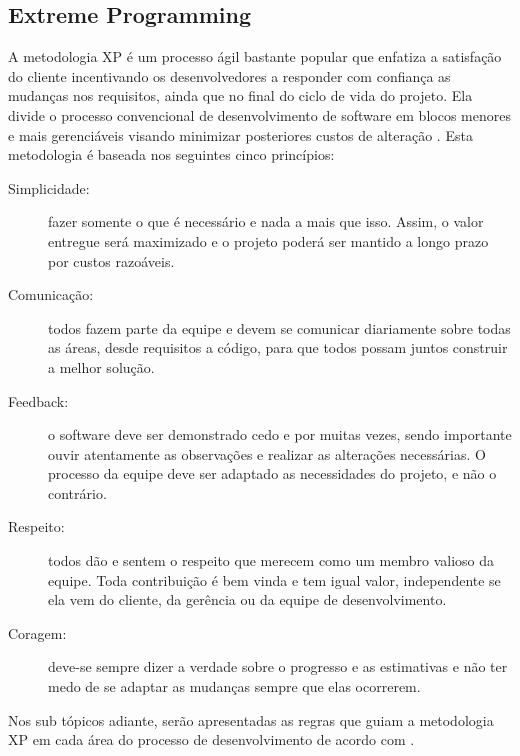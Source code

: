 \subsection{Extreme Programming}

A metodologia \gls{XP} é um processo ágil bastante popular que enfatiza a satisfação
do cliente incentivando os desenvolvedores a responder com confiança as mudanças
nos requisitos, ainda que no final do ciclo de vida do projeto. Ela divide o processo
convencional de desenvolvimento de software em blocos menores e mais gerenciáveis visando
minimizar posteriores custos de alteração \cite{Wells2000,Despa2014}. Esta metodologia é
baseada nos seguintes cinco princípios:

\begin{description}
    \item[Simplicidade:] fazer somente o que é necessário e nada a mais que isso. Assim,
    o valor entregue será maximizado e o projeto poderá ser mantido a longo prazo por
    custos razoáveis.
    \item[Comunicação:] todos fazem parte da equipe e devem se comunicar diariamente
    sobre todas as áreas, desde requisitos a código, para que todos possam juntos
    construir a melhor solução.
    \item[Feedback:] o software deve ser demonstrado cedo e por muitas vezes, sendo
    importante ouvir atentamente as observações e realizar as alterações necessárias.
    O processo da equipe deve ser adaptado as necessidades do projeto, e não o contrário.
    \item[Respeito:] todos dão e sentem o respeito que merecem como um membro valioso
    da equipe. Toda contribuição é bem vinda e tem igual valor, independente se ela vem
    do cliente, da gerência ou da equipe de desenvolvimento.
    \item[Coragem:] deve-se sempre dizer a verdade sobre o progresso e as estimativas e
    não ter medo de se adaptar as mudanças sempre que elas ocorrerem.
\end{description}

Nos sub tópicos adiante, serão apresentadas as regras que guiam a metodologia \gls{XP}
em cada área do processo de desenvolvimento de acordo com .

